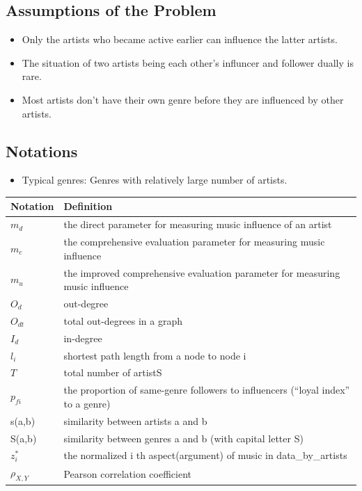 \documentclass[12pt]{article}
\begin{document}
\subsection{Assumptions of the Problem}
\begin{itemize}
\item Only the artists who became active earlier can influence the latter artists.
\item The situation of two artists being each other's influncer and follower dually is rare.
\item Most artists don't have their own genre before they are influenced by other artists.
\end{itemize}
\subsection{Notations}
\begin{itemize}
\item Typical genres: Genres with relatively large number of artists.
\end{itemize}
\begin{tabular}{l|l}
Notation  & Definition
\\ \hline
$m_d$ & the direct parameter for measuring music influence of an artist      \\   
$m_c$ & the comprehensive evaluation parameter for measuring music influence      \\ 
$m_u$ & the improved comprehensive evaluation parameter for measuring music influence      \\ 
$O_d$  & out-degree\\
$O_{dt}$  & total out-degrees in a graph\\
$I_d$  & in-degree\\
$l_i$  & shortest path length from a node to node i\\
$T$ & total number of artistS\\
$p_{fi}$ & the proportion of same-genre followers to influencers (``loyal index'' to a genre)\\
s(a,b) & similarity between artists a and b  \\
S(a,b) & similarity between genres a and b (with capital letter S) \\
$z_i^*$ & the normalized i th aspect(argument) of music in data\_by\_artists\\
${\displaystyle \rho _{X,Y}}$ & Pearson correlation coefficient 


\end{tabular}
\end{document}
